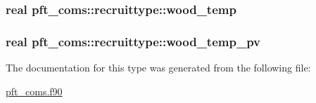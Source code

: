 \subsubsection[{wood\+\_\+temp}]{\setlength{\rightskip}{0pt plus 5cm}real pft\+\_\+coms\+::recruittype\+::wood\+\_\+temp}\label{structpft__coms_1_1recruittype_a39f74782c87f308b9f1578e5f64d2e5f}
\hypertarget{structpft__coms_1_1recruittype_a0d5f8dd1bdc575a902052df9d43d26e5}{}
\subsubsection[{wood\+\_\+temp\+\_\+pv}]{\setlength{\rightskip}{0pt plus 5cm}real pft\+\_\+coms\+::recruittype\+::wood\+\_\+temp\+\_\+pv}\label{structpft__coms_1_1recruittype_a0d5f8dd1bdc575a902052df9d43d26e5}


The documentation for this type was generated from the following file\+:\begin{DoxyCompactItemize}
\item 
\hyperlink{pft__coms_8f90}{pft\+\_\+coms.\+f90}\end{DoxyCompactItemize}
